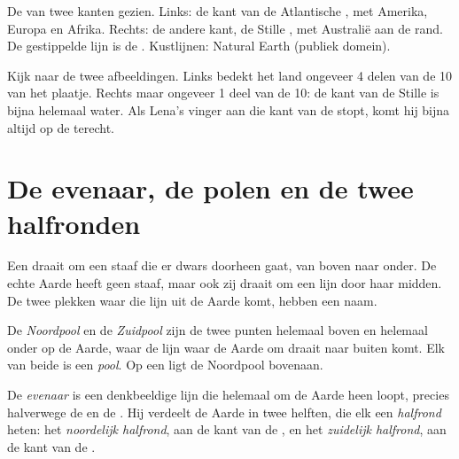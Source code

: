\begin{omfigure}
{\small De  van twee kanten gezien. Links: de kant van de Atlantische
, met Amerika, Europa en Afrika. Rechts: de andere kant, de Stille
, met Australië aan de rand. De gestippelde lijn is de .
Kustlijnen: Natural Earth (publiek domein).}
\label{fig:g3:continents-and-oceans:globes}
\end{omfigure}

\begin{remark}\label{rem:g3:continents-and-oceans:halves}
Kijk naar de twee afbeeldingen. Links bedekt het land ongeveer 4 delen van
de 10 van het plaatje. Rechts maar ongeveer 1 deel van de 10: de kant van
de Stille  is bijna helemaal water. Als Lena's vinger aan die kant
van de  stopt, komt hij bijna altijd op de  terecht.
\end{remark}

\section{De evenaar, de polen en de twee halfronden}

Een  draait om een staaf die er dwars doorheen gaat, van boven naar
onder. De echte Aarde heeft geen staaf, maar ook zij draait om een lijn
door haar midden. De twee plekken waar die lijn uit de Aarde komt, hebben
een naam.

\begin{definition}[Pool]\label{def:g3:continents-and-oceans:poles}
De \emph{Noordpool} en de \emph{Zuidpool}
zijn de twee punten helemaal boven en helemaal onder op de Aarde, waar de
lijn waar de Aarde om draait naar buiten komt. Elk van beide is een
\emph{pool}. Op een  ligt de Noordpool bovenaan.
\end{definition}

\begin{definition}\label{def:g3:continents-and-oceans:equator}
De \emph{evenaar} is een denkbeeldige lijn die helemaal om
de Aarde heen loopt, precies halverwege de  en de . Hij
verdeelt de Aarde in twee helften, die elk een
\emph{halfrond} heten: het \emph{noordelijk
halfrond}, aan de kant van de , en het
\emph{zuidelijk halfrond}, aan de kant van de
.
\end{definition}

